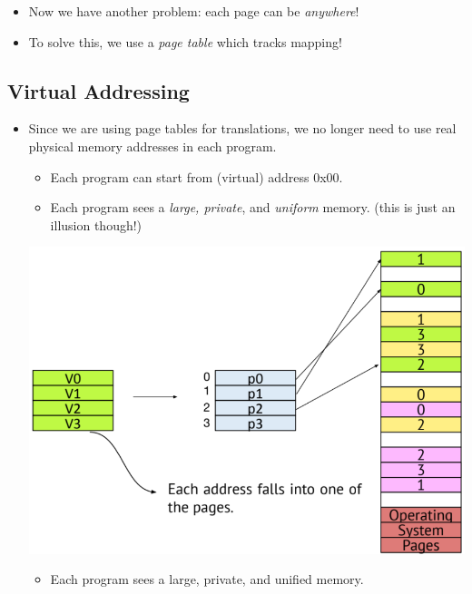 \documentclass[10pt]{article}
\begin{document}
\begin{itemize}
    \item Now we have another problem: each page can be \textit{anywhere}!
    \item To solve this, we use a \textit{page table} which tracks mapping!
\end{itemize}

\subsection*{Virtual Addressing}
\begin{itemize}
    \item Since we are using page tables for translations, we no longer need to use real physical memory addresses in each program.
    \begin{itemize}
        \item Each program can start from (virtual) address 0x00.
        \item Each program sees a \textit{large, private}, and \textit{uniform} memory.  (this is just an illusion though!)
    \end{itemize}
    \begin{center}
        \includegraphics*[scale=0.6]{W7_10.png}\\
    \end{center}
    \begin{itemize}
        \item Each program sees a large, private, and unified memory.
    \end{itemize}
    \begin{center}

\end{center}
\end{itemize}
\end{document}
